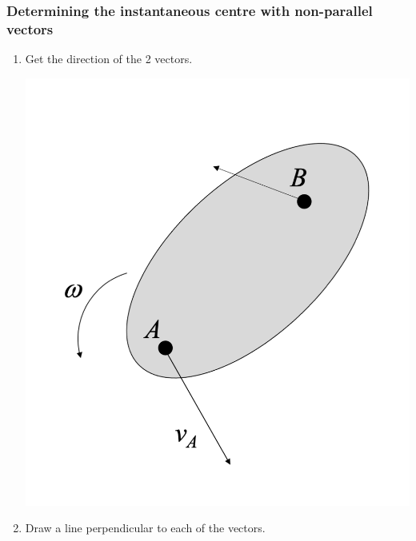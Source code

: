 \documentclass[11pt]{article}
\begin{document}
\subsubsection{Determining the instantaneous centre with non-parallel vectors}
\label{sec:orgc6dd43b}
\begin{enumerate}
\item Get the direction of the 2 vectors.
\begin{center}
\includegraphics[scale=0.4]{./images/instantaneous-centre-non-parallel-vectors-first-step.png}
\end{center}
\item Draw a line perpendicular to each of the vectors.
\begin{center}

\end{center}
\end{enumerate}
\end{document}
